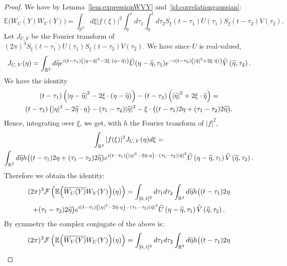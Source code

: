 \documentclass[10pt]{amsart}
\theoremstyle{definition}\newtheorem{defi}[theo]{Definition}\newtheorem{rema}[theo]{Remark}\newtheorem{exam}[theo]{Example}\newtheorem{exem}[theo]{Example}\newtheorem{nota}[theo]{Notation}
\newcommand{\R}{\mathbb{R}}
\newcommand{\E}{\mathbb{E}}
\newcommand{\mclF}{\mathcal{F}}
\let\oldtilde\tilde
\renewcommand*{\tilde}[1]{\mathchoice{\widetilde{#1}}{\widetilde{#1}}{\oldtilde{#1}}{\oldtilde{#1}}}
\let\oldhat\hat
\renewcommand*{\hat}[1]{\mathchoice{\widehat{#1}}{\widehat{#1}}{\oldhat{#1}}{\oldhat{#1}}}
\begin{document}
\begin{proof}
We have by Lemma~\ref{lem:expressionWVY} and~\eqref{id:correlationgaussian}:
\[
\E\Big(\overline{W_U(Y)} W_V(Y)\Big) = \int_{\R^3} d\xi |f(\xi)|^2 \int_0^t d\tau_1 \int_0^{t} d\tau_2 \overline{S_\xi(t-\tau_1) U(\tau_1)} S_\xi (t-\tau_2) V(\tau_2).
\]
Let $J_{U,V}$ be the Fourier transform of $(2\pi)^3\overline{S_\xi(t-\tau_1) U(\tau_1)} S_\xi (t-\tau_2) V(\tau_2)$. We have since $U$ is real-valued,
\[
J_{U,\,V}(\eta)= \int_{\R^3} d\tilde{\eta} e^{i(t-\tau_1)\left(\left|\eta-\tilde{\eta}\right|^2-2\xi \cdot \left(\eta-\tilde{\eta}\right)\right)}\hat U(\eta-\tilde{\eta},\tau_1)e^{-i(t-\tau_2)\left(\left|\tilde{\eta}\right|^2 +2\xi \cdot \tilde{\eta})\right) } \hat V\left(\tilde{\eta},\tau_2\right).
\]
We have the identity
\begin{multline*}
(t-\tau_1)\left(\left|\eta-\tilde{\eta}\right|^2-2\xi \cdot \left(\eta-\tilde{\eta}\right)\right) -(t-\tau_2)\left(\left|\tilde{\eta}\right|^2 +2\xi \cdot \tilde{\eta}\right) = \\
(t-\tau_1)\left(|\eta|^2-2\tilde{\eta}\cdot \eta\right) -(\tau_1-\tau_2)|\tilde{\eta}|^2-\xi\cdot \big((t-\tau_1)2\eta+(\tau_1-\tau_2)2\tilde \eta\big).
\end{multline*}
Hence, integrating over $\xi$, we get, with $h$ the Fourier transform of $|f|^2$,
\begin{multline*}
\int_{\R^3} |f(\xi)|^2 J_{U,\,V}(\eta) d\xi =\\
\int_{\R^3} d\tilde{\eta} h\big((t-\tau_1)2\eta + (\tau_1-\tau_2) 2\tilde{\eta}\big) e^{i(t-\tau_1)\left(|\eta|^2-2\tilde{\eta}\cdot \eta\right)-(\tau_1-\tau_2)|\tilde{\eta}|^2}\hat U\left(\eta-\tilde{\eta},\tau_1\right) \hat V\left(\tilde{\eta},\tau_2\right).
\end{multline*}
Therefore we obtain the identity:
\begin{multline}\label{id:J1part1}
(2\pi)^{3} \mclF \left(\E\Big(\overline{W_U(Y)} W_V(Y)\Big)(\eta)\right)
 = \int_{[0,\,t]^2} d\tau_1d\tau_2\int_{\R^3} d\tilde{\eta} h\big((t-\tau_1)2\eta\\
+ (\tau_1-\tau_2) 2\tilde{\eta}\big) e^{i(t-\tau_1)\left(|\eta|^2-2\tilde{\eta}\cdot \eta\right)-(\tau_1-\tau_2)|\tilde{\eta}|^2 }\hat U\left(\eta-\tilde{\eta},\tau_1\right) \hat V\left(\tilde{\eta},\tau_2\right).
\end{multline}
By symmetry the complex conjugate of the above is:
\begin{multline*}
(2\pi)^{3}\mclF \left(\E\Big(\overline{W_V(Y)} W_U(Y)\Big)(\eta)\right)
= \int_{[0,\,t]^2} d\tau_1d\tau_2\int_{\R^3} d\tilde{\eta} h\big((t-\tau_1)2\eta \\

\end{multline*}
\end{proof}
\end{document}
